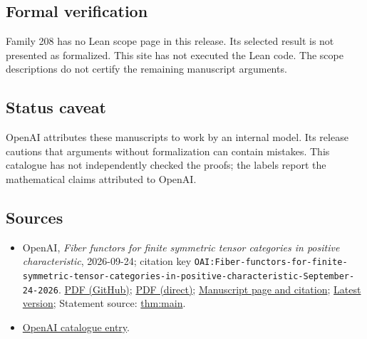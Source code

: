 \documentclass[11pt]{article}
\begin{document}
\subsection{Formal verification}
Family 208 has no Lean scope page in this release. Its selected result is not presented as formalized. This site has not executed the Lean code. The scope descriptions do not certify the remaining manuscript arguments.

\subsection{Status caveat}
OpenAI attributes these manuscripts to work by an internal model. Its release cautions that arguments without formalization can contain mistakes. This catalogue has not independently checked the proofs; the labels report the mathematical claims attributed to OpenAI.

\subsection{Sources}
\begin{itemize}
\item OpenAI, \emph{Fiber functors for finite symmetric tensor categories in positive characteristic}, 2026-09-24; citation key \texttt{OAI:Fiber-functors-for-finite-symmetric-tensor-categories-in-positive-characteristic-September-24-2026}. \href{https://github.com/openai/math/blob/adc7f1241b42e322a6451854ab7e4b4c146bf78a/preprints/Fiber-functors-for-finite-symmetric-tensor-categories-in-positive-characteristic-September-24-2026/paper.pdf}{PDF (GitHub)}; \href{https://github.com/openai/math/raw/adc7f1241b42e322a6451854ab7e4b4c146bf78a/preprints/Fiber-functors-for-finite-symmetric-tensor-categories-in-positive-characteristic-September-24-2026/paper.pdf}{PDF (direct)}; \href{https://github.com/openai/math/blob/adc7f1241b42e322a6451854ab7e4b4c146bf78a/preprints/Fiber-functors-for-finite-symmetric-tensor-categories-in-positive-characteristic-September-24-2026/README.md}{Manuscript page and citation}; \href{https://github.com/openai/math/blob/main/preprints/Fiber-functors-for-finite-symmetric-tensor-categories-in-positive-characteristic-September-24-2026/paper.pdf}{Latest version}; Statement source: \href{https://github.com/openai/math/blob/adc7f1241b42e322a6451854ab7e4b4c146bf78a/preprints/Fiber-functors-for-finite-symmetric-tensor-categories-in-positive-characteristic-September-24-2026/build/sections/introduction.tex\#L35}{thm:main}.
\item \href{https://github.com/openai/math/blob/adc7f1241b42e322a6451854ab7e4b4c146bf78a/CONTENTS.md}{OpenAI catalogue entry}.
\end{itemize}
\end{document}

